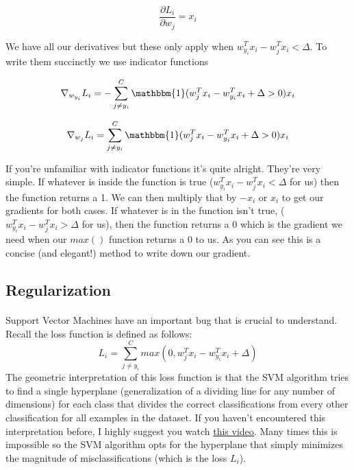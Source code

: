 \documentclass[12pt]{article}
\begin{document}
\begin{equation}
    \frac{\partial L_i}{\partial w_j} = x_i
\end{equation}

\noindent We have all our derivatives but these only apply when 
$w_{y_i}^T x_i - w_j^T x_i < \Delta$. To write them succinctly we use indicator functions

\begin{equation}
    \nabla_{w_{y_i}} L_i = -\sum_{j \neq y_i}^C \mathbbm{1}
        (w_j^T x_i - w_{y_i}^T x_i + \Delta > 0)x_i
\end{equation}

\begin{equation}
    \nabla_{w_j} L_i = \sum_{j \neq y_i}^C \mathbbm{1}
        (w_j^T x_i - w_{y_i}^T x_i + \Delta > 0)x_i
\end{equation}

\noindent If you're unfamiliar with indicator functions it's quite alright. They're very simple. 
If whatever is inside the function is true ($w_{y_i}^T x_i - w_j^T x_i < \Delta$ for us) 
then the function returns a 1. We can then multiply that by $-x_i$ or $x_i$ to get our 
gradients for both cases. If whatever is in the function isn't true, 
($w_{y_i}^T x_i - w_j^T x_i > \Delta$ for us), then the function returns a 0 which is 
the gradient we need when our $max()$ function returns a 0 to us. As you can see this 
is a concise (and elegant!) method to write down our gradient.




\subsection{Regularization}

\paragraph{}
Support Vector Machines have an important bug that is crucial to understand. Recall the 
loss function is defined as follows: 
\begin{equation}
    L_{i} = \sum_{j \neq y_{i}}^C max(0, w_{j}^T x_i - w_{y_i}^T x_i + \Delta)
\end{equation}
The geometric interpretation of this loss function is that the SVM algorithm tries to find a single 
hyperplane (generalization of a dividing line for any number of dimensions) 
for each class that divides the correct classifications from every other 
classification for all examples in the dataset. If you haven't encountered this 
interpretation before, I highly suggest you watch \href{https://www.youtube.com/watch?v=efR1C6CvhmE}{this video}. 
Many times this is impossible so the SVM algorithm opts for the hyperplane that 
simply minimizes the magnitude of misclassifications (which is the loss $L_i$). 
\end{document}

